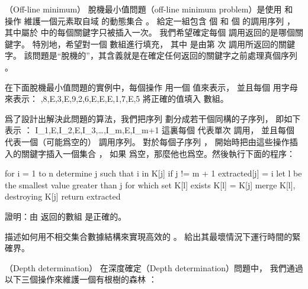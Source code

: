 \startsubject[
  title={Problems},
]

\startPROBLEM
（Off-line minimum）
{\EMP 脫機最小值問題}（off-line minimum problem）是使用  和  操作
維護一個元素取自域  的動態集合 。
給定一組包含  個  和  個  的調用序列 ，
其中屬於  中的每個關鍵字只被插入一次。
我們希望確定每個  調用返回的是哪個關鍵字。
特別地，希望對一個  數組進行填充，
其中  是由第  次  調用所返回的關鍵字。
該問題是“脫機的”，其含義就是在確定任何返回的關鍵字之前處理真個序列 。

\startigBase[a]\startitem
在下面脫機最小值問題的實例中，每個操作  用一個  值來表示，
並且每個  用字母  來表示：
,8,E,3,E,9,2,6,E,E,E,1,7,E,5
\stopformula
將正確的值填入  數組。
\stopitem\stopigBase

\startANSWER
{}
\stopANSWER

爲了設計出解決此問題的算法，我們把序列  劃分成若干個同構的子序列，
即如下表示 ：
\startformula
I_1,E,I_2,E,I_3,\ldots,I_m,E,I_{m+1}
\stopformula
這裏每個  代表單次  調用，
並且每個  代表一個（可能爲空的）  調用序列。
對於每個子序列 ，
開始時把由這些操作插入的關鍵字插入一個集合 ，
如果  爲空，那麼他也爲空。然後執行下面的程序：

\startCLRS
for i = 1 to n
	determine j such that i in K[j]
	if j != m + 1
		extracted[j] = i
		let l be the smallest value greater than j
			for which set K[l] exists
		K[l] = K[j] merge K[l], destroying K[j]
return extracted
\stopCLRS

\startigBase[continue]\startitem
證明：由  返回的數組  是正確的。
\stopitem\stopigBase

\startANSWER
{}
\stopANSWER

\startigBase[continue]\startitem
描述如何用不相交集合數據結構來實現高效的 。
給出其最壞情況下運行時間的緊確界。
\stopitem\stopigBase

\startANSWER
{}
\stopANSWER

\stopPROBLEM

\startPROBLEM
（Depth determination）
在{\EMP 深度確定}（Depth determination）問題中，
我們通過以下三個操作來維護一個有根樹的森林 ：

